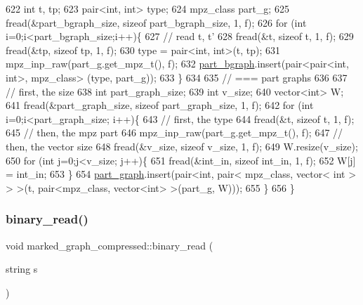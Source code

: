 \begin{DoxyCode}
622   \textcolor{keywordtype}{int} t, tp;
623   pair<int, int> type; 
624   mpz\_class part\_g; 
625   fread(&part\_bgraph\_size, \textcolor{keyword}{sizeof} part\_bgraph\_size, 1, f);
626   \textcolor{keywordflow}{for} (\textcolor{keywordtype}{int} i=0;i<part\_bgraph\_size;i++)\{
627     \textcolor{comment}{// read t, t'}
628     fread(&t, \textcolor{keyword}{sizeof} t, 1, f);
629     fread(&tp, \textcolor{keyword}{sizeof} tp, 1, f);
630     type = pair<int, int>(t, tp);
631     mpz\_inp\_raw(part\_g.get\_mpz\_t(), f);
632     \hyperlink{classmarked__graph__compressed_a7b3267063fba30b45eb21b3ba4e07536}{part\_bgraph}.insert(pair<pair<int, int>, mpz\_class> (type, part\_g));
633   \}
634 
635   \textcolor{comment}{// === part graphs}
636 
637   \textcolor{comment}{// first, the size}
638   \textcolor{keywordtype}{int} part\_graph\_size;
639   \textcolor{keywordtype}{int} v\_size;
640   vector<int> W; 
641   fread(&part\_graph\_size, \textcolor{keyword}{sizeof} part\_graph\_size, 1, f);
642   \textcolor{keywordflow}{for} (\textcolor{keywordtype}{int} i=0;i<part\_graph\_size; i++)\{
643     \textcolor{comment}{// first, the type}
644     fread(&t, \textcolor{keyword}{sizeof} t, 1, f);
645     \textcolor{comment}{// then, the mpz part}
646     mpz\_inp\_raw(part\_g.get\_mpz\_t(), f);
647     \textcolor{comment}{// then, the vector size}
648     fread(&v\_size, \textcolor{keyword}{sizeof} v\_size, 1, f);
649     W.resize(v\_size);
650     \textcolor{keywordflow}{for} (\textcolor{keywordtype}{int} j=0;j<v\_size; j++)\{
651       fread(&int\_in, \textcolor{keyword}{sizeof} int\_in, 1, f);
652       W[j] = int\_in;
653     \}
654     \hyperlink{classmarked__graph__compressed_ae179a4737e6eab905c18a94d44ef64b7}{part\_graph}.insert(pair<\textcolor{keywordtype}{int}, pair< mpz\_class, vector< int > > >(t, pair<mpz\_class, vector<int>
       >(part\_g, W)));
655   \}
656 \}
\end{DoxyCode}
\mbox{\label{classmarked__graph__compressed_a01c67fe4234738db6bb60459515c3ad8}} 
\subsubsection{\texorpdfstring{binary\+\_\+read()}{binary\_read()}\hspace{0.1cm}{\footnotesize\ttfamily [2/2]}}
{\footnotesize\ttfamily void marked\+\_\+graph\+\_\+compressed\+::binary\+\_\+read (\begin{DoxyParamCaption}\item[{string}]{s }\end{DoxyParamCaption})}

